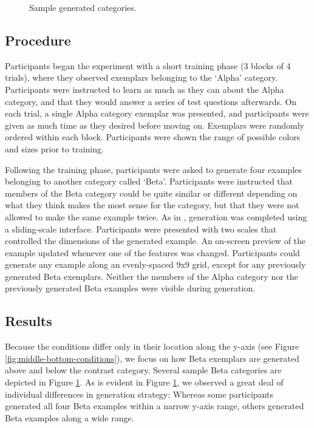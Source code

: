 \documentclass[10pt,letterpaper]{article}
\newcommand\inputpgf[2]{{
\let\pgfimageWithoutPath\pgfimage
\renewcommand{\pgfimage}[2][]{\pgfimageWithoutPath[##1]{#1/##2}}

}}
\begin{document}
\begin{figure}[ht!]
    \begin{center}
    \inputpgf{figs/}{beta.samples.pgf}
    \caption{Sample generated categories. }
    \label{fig:beta.samples}
    \end{center}
\end{figure}

\subsection{Procedure}

Participants began the experiment with a short training phase (3 blocks of 4 trials), where they observed exemplars belonging to the `Alpha' category. Participants were instructed to learn as much as they can about the Alpha category, and that they would answer a series of test questions afterwards. On each trial, a single Alpha category exemplar was presented, and participants were given as much time as they desired before moving on. Exemplars were randomly ordered within each block. Participants were shown the range of possible colors and sizes prior to training.

Following the training phase, participants were asked to generate four examples belonging to another category called `Beta'. Participants were instructed that members of the Beta category could be quite similar or different depending on what they think makes the most sense for the category, but that they were not allowed to make the same example twice. As in \citet{jern2013probabilistic}, generation was completed using a sliding-scale interface. Participants were presented with two scales that controlled the dimensions of the generated example. An on-screen preview of the example updated whenever one of the features was changed. Participants could generate any example along an evenly-spaced 9x9 grid, except for any previously generated Beta exemplars. Neither the members of the Alpha category nor the previously generated Beta examples were visible during generation. 

\subsection{Results}

Because the conditions differ only in their location along the y-axis (see Figure \ref{fig:middle-bottom-conditions}), we focus on how Beta exemplars are generated above and below the contrast category. Several sample Beta categories are depicted in Figure \ref{fig:beta.samples}. As is evident in Figure \ref{fig:beta.samples}, we observed a great deal of individual differences in generation strategy: Whereas some participants generated all four Beta examples within a narrow y-axis range, others generated Beta examples along a wide range. 
\end{document}
